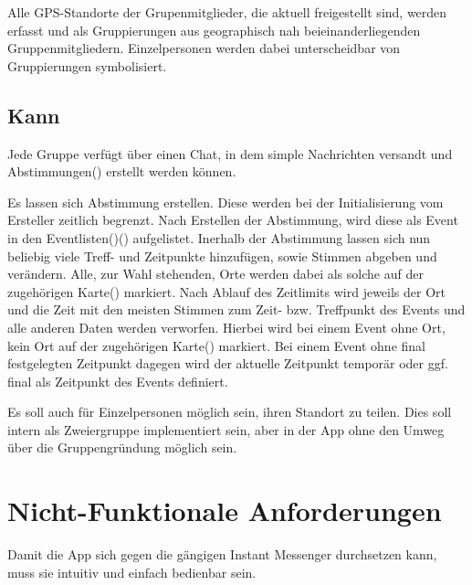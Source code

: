 \documentclass[parskip=full,11pt]{scrartcl}
\begin{document}
Alle GPS-Standorte der Grupenmitglieder, die aktuell freigestellt sind,
werden erfasst und als Gruppierungen aus geographisch nah beieinanderliegenden Gruppenmitgliedern.
Einzelpersonen werden dabei unterscheidbar von Gruppierungen symbolisiert.

\subsection{Kann}

Jede Gruppe verfügt über einen Chat, in dem simple Nachrichten versandt und
Abstimmungen() erstellt werden können.

Es lassen sich Abstimmung erstellen.
Diese werden bei der Initialisierung vom Ersteller zeitlich begrenzt.
Nach Erstellen der Abstimmung, wird diese als Event in den
Eventlisten()() aufgelistet.
Inerhalb der Abstimmung lassen sich nun beliebig viele Treff- und Zeitpunkte hinzufügen, sowie Stimmen abgeben und verändern.
Alle, zur Wahl stehenden, Orte werden dabei als solche auf der zugehörigen Karte() markiert.
Nach Ablauf des Zeitlimits wird jeweils der Ort und die Zeit mit den meisten Stimmen
zum Zeit- bzw. Treffpunkt des Events und alle anderen Daten werden verworfen.
Hierbei wird bei einem Event ohne Ort, kein Ort auf der zugehörigen Karte() markiert.
Bei einem Event ohne final festgelegten Zeitpunkt dagegen wird der aktuelle Zeitpunkt
temporär oder ggf. final als Zeitpunkt des Events definiert.

Es soll auch für Einzelpersonen möglich sein, ihren Standort zu teilen.
Dies soll intern als Zweiergruppe implementiert sein, aber in der App ohne den Umweg über die Gruppengründung möglich sein.

\section{Nicht-Funktionale Anforderungen}

Damit die App sich gegen die gängigen Instant Messenger durchsetzen kann, muss sie intuitiv und einfach bedienbar sein.
\end{document}
